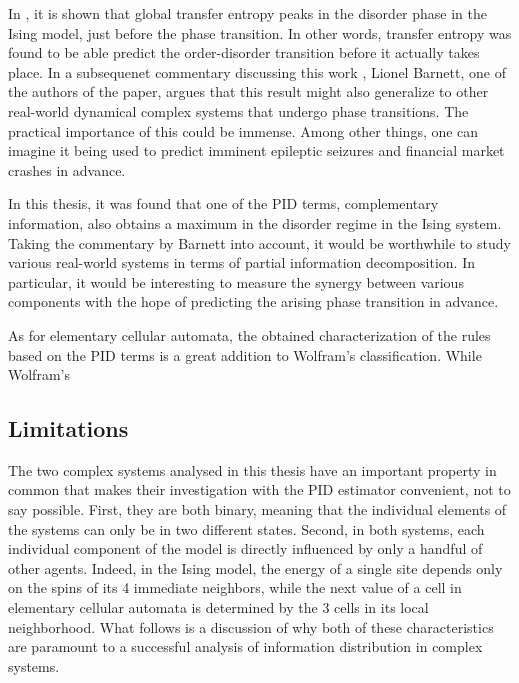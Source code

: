 \documentclass[12pt]{article}
\begin{document}
In \cite{barnett-ising}, it is shown that global transfer entropy peaks in the disorder phase in the Ising model, just before the phase transition. In other words, transfer entropy was found to be able predict the order-disorder transition before it actually takes place. In a subsequenet commentary discussing this work \cite{inf-flow-ising-commentary}, Lionel Barnett, one of the authors of the paper, argues that this result might also generalize to other real-world dynamical complex systems that undergo phase transitions. The practical importance of this could be immense. Among other things, one can imagine it being used to predict imminent epileptic seizures and financial market crashes in advance. 

In this thesis, it was found that one of the PID terms, complementary information, also obtains a maximum in the disorder regime in the Ising system. Taking the commentary by Barnett into account, it would be worthwhile to study various real-world systems in terms of partial information decomposition. In particular, it would be interesting to measure the synergy between various components with the hope of predicting the arising phase transition  in advance.

As for elementary cellular automata, the obtained characterization of the rules based on the PID terms is a great addition to Wolfram's classification. While Wolfram's 

\subsection{Limitations}

The two complex systems analysed in this thesis have an important property in common that makes their investigation with the PID estimator convenient, not to say possible. First, they are both binary, meaning that the individual elements of the systems can only be in two different states. Second, in both systems, each individual component of the model is directly influenced by only a handful of other agents. Indeed, in the Ising model, the energy of a single site depends only on the spins of its 4 immediate neighbors, while the next value of a cell in elementary cellular automata is determined by the 3 cells in its local neighborhood. What follows is a discussion of why both of these characteristics are paramount to a successful analysis of information distribution in complex systems. 
\end{document}
